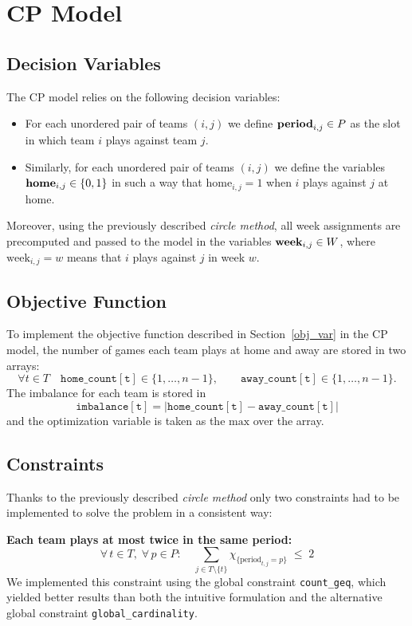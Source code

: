 \section{CP Model}

\subsection{Decision Variables}
The CP model relies on the following decision variables:

\begin{itemize}
    \item For each unordered pair of teams $(i,j)$ we define $\text{\textbf{period}}_{i,j} \in P$ as the slot in which team $i$ plays against team $j.$
    \item Similarly, for each unordered pair of teams $(i,j)$ we define the variables $\text{\textbf{home}}_{i,j}\in \{0, 1\}$ in such a way that $\text{home}_{i,j}=1$ when $i$ plays against $j$ at home.
\end{itemize}

Moreover, using the previously described \emph{circle method}, all week assignments are precomputed and passed to the model in the variables $\text{\textbf{week}}_{i,j} \in W$, where $\text{week}_{i,j} = w$ means that $i$ plays against $j$ in week $w$.

\subsection{Objective Function}
To implement the objective function described in Section~\ref{obj_var} in the CP model, the number of games each team plays at home and away are stored in two arrays:
\[
\forall t \in T \quad \mathtt{home\_count[t]} \in \{1, \dots, n-1\}, 
\qquad
\mathtt{away\_count[t]} \in \{1, \dots, n-1\}.
\]
The imbalance for each team is stored in
\[
\mathtt{imbalance[t]} = \lvert \mathtt{home\_count[t]} - \mathtt{away\_count[t]} \rvert
\]
and the optimization variable is taken as the $\text{max}$ over the array.

\subsection{Constraints}
Thanks to the previously described \emph{circle method} only two constraints had to be implemented to solve the problem in a consistent way:

\textbf{Each team plays at most twice in the same period:}
\[
\forall\, t \in T,\; \forall\, p \in P:\quad 
\sum_{j \in T \setminus \{t\}} \chi_{\{\text{period}_{t,j} = p\}} \;\leq\; 2
\]
We implemented this constraint using the global constraint \texttt{count\_geq}, which yielded better results than both the intuitive formulation and the alternative global constraint \texttt{global\_cardinality}.

